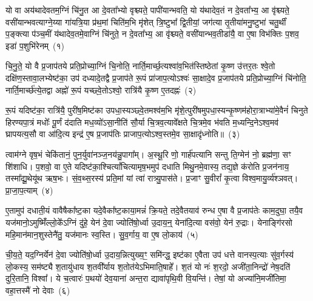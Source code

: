 \setcounter{anuvakam}{0}
यो वा अय॑थादेवतम॒ग्निं चि॑नु॒त आ दे॒वता᳚भ्यो वृश्च्यते॒ पापी॑यान्भवति॒ यो य॑थादेव॒तं न दे॒वता᳚भ्य॒ आ वृ॑श्च्यते॒ वसी॑यान्भवत्याग्ने॒य्या गा॑यत्रि॒या प्र॑थ॒मां चिति॑म॒भि मृ॑शेत् त्रि॒ष्टुभा᳚ द्वि॒तीयां॒ जग॑त्या तृ॒तीया॑मनु॒ष्टुभा॑ चतु॒र्थीं प॒ङ्क्त्या प॑ञ्च॒मीं य॑थादेव॒तमे॒वाग्निं चि॑नुते॒ न दे॒वता᳚भ्य॒ आ वृ॑श्च्यते॒ वसी॑यान्भव॒तीडा॑यै॒ वा ए॒षा विभ॑क्तिः प॒शव॒ इडा॑ प॒शुभि॑रेनम्~(१)\ip

चि॒नु॒ते॒ यो वै प्र॒जा\-प॑तये प्रति॒प्रोच्या॒ग्निं चि॒नोति॒ नार्ति॒मार्च्छ॒त्यश्वा॑व॒भित॑स्तिष्ठेतां कृ॒ष्ण उ॑त्तर॒तः श्वे॒तो दक्षि॑ण॒\-स्तावा॒लभ्येष्ट॑का॒ उप॑ दध्यादे॒तद्वै प्र॒जा\-प॑ते रू॒पं प्रा॑जाप॒त्यो\-ऽश्वः॑ सा॒क्षादे॒व प्र॒जा\-प॑तये प्रति॒प्रोच्या॒ग्निं चि॑नोति॒ नार्ति॒मार्च्छ॑त्ये॒तद्वा अह्नो॑ रू॒पं यच्छ्वे॒तो\-ऽश्वो॒ रात्रि॑यै कृ॒ष्ण ए॒तदह्नः॑~(२)\ip

रू॒पं यदिष्ट॑का॒ रात्रि॑यै॒ पुरी॑ष॒मिष्ट॑का उपधा॒स्यञ्छ्वे॒तमश्व॑म॒भि मृ॑शे॒त्पुरी॑षमुपधा॒स्यन्कृ॒ष्णम॑होरा॒त्राभ्या॑मे॒वैनं॑ चिनुते हिरण्यपा॒त्रं मधोः᳚ पू॒र्णं द॑दाति मध॒व्यो॑\-ऽसा॒नीति॑ सौ॒र्या चि॒त्रव॒त्यावे᳚क्षते चि॒त्रमे॒व भ॑वति म॒ध्यन्दि॒ने\-ऽश्व॒मव॑ घ्रापयत्य॒सौ वा आ॑दि॒त्य इन्द्र॑ ए॒ष प्र॒जा\-प॑तिः प्राजाप॒त्यो\-ऽश्व॒स्तमे॒व सा॒क्षादृ॑ध्नोति॥~(३)\ip

{}

त्वाम॑ग्ने वृष॒भं चेकि॑तानं॒ पुन॒र्युवा॑नञ्ज॒नय॑न्नु॒पागा᳚म्। अ॒स्थू॒रि णो॒ गार्\mbox{}ह॑पत्यानि सन्तु ति॒ग्मेन॑ नो॒ ब्रह्म॑णा॒ सꣳ शि॑शाधि। प॒शवो॒ वा ए॒ते यदिष्ट॑का॒श्चित्यां᳚चित्यामृष॒भमुप॑ दधाति मिथु॒नमे॒वास्य॒ तद्य॒ज्ञे क॑रोति प्र॒जन॑नाय॒ तस्मा᳚द्यू॒थेयू॑थ ऋष॒भः। सं॒व॒थ्स॒रस्य॑ प्रति॒मां यां त्वा॑ रात्र्यु॒पास॑ते। प्र॒जाꣳ सु॒वीरां᳚ कृ॒त्वा विश्व॒मायु॒र्व्य॑श्ञवत्। प्रा॒जा॒प॒त्याम्~(४)\ip

ए॒तामुप॑ दधाती॒यं वावैषैका᳚ष्ट॒का यदे॒वैका᳚ष्ट॒काया॒मन्नं॑ क्रि॒यते॒ तदे॒वैतयाव॑ रुन्ध ए॒षा वै प्र॒जा\-प॑तेः काम॒दुघा॒ तयै॒व यज॑मानो॒\-ऽमुष्मिँ॑ल्लो॒के᳚\-ऽग्निं दु॑हे॒ येन॑ दे॒वा ज्योति॑षो॒र्ध्वा उ॒दाय॒न्॒ येना॑दि॒त्या वस॑वो॒ येन॑ रु॒द्राः। येनाङ्गि॑रसो महि॒मान॑मान॒शुस्तेनै॑तु॒ यज॑मानः स्व॒स्ति। सु॒व॒र्गाय॒ वा ए॒ष लो॒काय॑~(५)\ip

ची॒य॒ते॒ यद॒ग्निर्येन॑ दे॒वा ज्योति॑षो॒र्ध्वा उ॒दाय॒न्नित्युख्य॒ꣳ॒ समि॑न्द्ध॒ इष्ट॑का ए॒वैता उप॑ धत्ते वानस्प॒त्याः सु॑व॒र्गस्य॑ लो॒कस्य॒ सम॑ष्ट्यै श॒तायु॑धाय श॒तवी᳚र्याय श॒तोत॑ये\-ऽभिमाति॒षाहे᳚। श॒तं यो नः॑ श॒रदो॒ अजी॑ता॒निन्द्रो॑ नेष॒दति॑ दुरि॒तानि॒ विश्वा᳚। ये च॒त्वारः॑ प॒थयो॑ देव॒याना॑ अन्त॒रा द्यावा॑\-पृथि॒वी वि॒यन्ति॑। तेषां॒ यो अज्या॑नि॒मजी॑तिमा॒ वहा॒त्तस्मै॑ नो देवाः~(६)\ip

